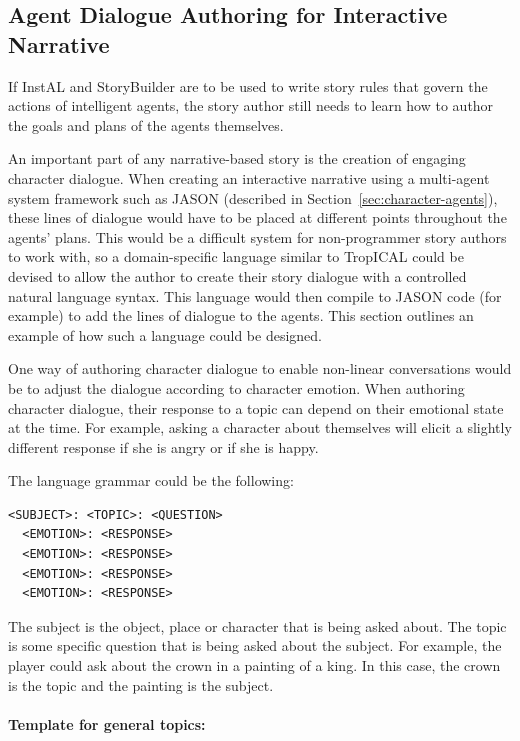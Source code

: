 \documentclass[11pt]{report}
\begin{document}
\subsection{Agent Dialogue Authoring for Interactive Narrative}

If InstAL and StoryBuilder are to be used to write story rules that govern the
actions of intelligent agents, the story author still needs to learn how to
author the goals and plans of the agents themselves.

An important part of any narrative-based story is the creation of engaging
character dialogue. When creating an interactive narrative using a multi-agent
system framework such as JASON (described in
Section~\ref{sec:character-agents}), these lines of dialogue would have to be
placed at different points throughout the agents' plans. This would be a difficult
system for non-programmer story authors to work with, so a domain-specific
language similar to TropICAL could be devised to allow the author to create
their story dialogue with a controlled natural language syntax. This language
would then compile to JASON code (for example) to add the lines of dialogue to
the agents. This section outlines an example of how such a language could be designed.

One way of authoring character dialogue to enable non-linear conversations would
be to adjust the dialogue according to character emotion. When authoring character dialogue, their response to a topic can depend on their
emotional state at the time. For example, asking a character about themselves will elicit a slightly different response if she is angry or if she is happy.

The language grammar could be the following:

\begin{lstlisting}
<SUBJECT>: <TOPIC>: <QUESTION>
  <EMOTION>: <RESPONSE>
  <EMOTION>: <RESPONSE>
  <EMOTION>: <RESPONSE>
  <EMOTION>: <RESPONSE>
\end{lstlisting}

The subject is the object, place or character that is being asked about. The
topic is some specific question that is being asked about the subject. For
example, the player could ask about the crown in a painting of a king. In this case, the crown is the topic and the painting is the subject.

\paragraph{Template for general topics:}
\end{document}

